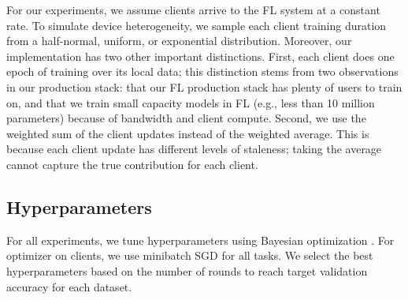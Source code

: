 \documentclass[twoside]{article}
\begin{document}
For our experiments, we assume clients arrive to the FL system at a constant rate. To simulate device heterogeneity, we sample each client training duration from a half-normal, uniform, or exponential distribution. Moreover, our implementation has two other important distinctions. First, each client does one epoch of training over its local data; this distinction stems from two observations in our production stack: that our FL production stack has plenty of users to train on, and that we train small capacity models in FL (e.g., less than 10 million parameters) because of bandwidth and client compute. Second, we use the weighted sum of the client updates instead of the weighted average. This is because each client update has different levels of staleness; taking the average cannot capture the true contribution for each client. 

\subsection{Hyperparameters}
\label{sec:appendix_hyper}
For all experiments, we tune hyperparameters using Bayesian optimization \citep{bayesian-opt}. For optimizer on clients, we use minibatch SGD for all tasks. We select the best hyperparameters based on the number of rounds to reach target validation accuracy for each dataset. 
\end{document}
